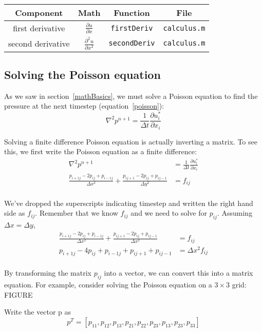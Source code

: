 \documentclass[12pt]{article}
\begin{document}
\begin{center}
\begin{tabular}{|c|c|c|c|}
\hline 
\bf{Component} & \bf{Math} & \bf{Function} & \bf{File}\\ 
\hline 
first derivative & $\frac{\partial u}{\partial x}$ & \texttt{firstDeriv} & \texttt{calculus.m}\\ 
\hline 
second derivative & $\frac{\partial^2 u}{\partial x^2}$ & \texttt{secondDeriv} & \texttt{calculus.m}\\ 
\hline 
\end{tabular} 
\end{center}

\subsection{Solving the Poisson equation}
As we saw in section~\ref{mathBasics}, we must solve a Poisson equation to find the pressure at the next timestep (equation~\ref{poisson}):
\[\nabla^2 p^{n+1} = \frac{1}{\Delta t}\frac{\partial u_i^*}{\partial x_i} \]

Solving a finite difference Poisson equation is actually inverting a matrix.  To see this, we first write the Poisson equation as a finite difference:
\begin{align*}
\nabla^2 p^{n+1} &= \frac{1}{\Delta t}\frac{\partial u_i^*}{\partial x_i} \\
\frac{p_{i+1j}-2p_{ij}+p_{i-1j}}{\Delta x^2} + \frac{p_{ij+1}-2p_{ij}+p_{ij-1}}{\Delta y^2} &= f_{ij}  \\
\end{align*}

We've dropped the superscripts indicating timestep and written the right hand side as $f_{ij}$.  Remember that we know $f_{ij}$ and we need to solve for $p_{ij}$.  Assuming $\Delta x = \Delta y$,
\begin{align*}
\frac{p_{i+1j}-2p_{ij}+p_{i-1j}}{\Delta x^2} + \frac{p_{ij+1}-2p_{ij}+p_{ij-1}}{\Delta x^2} &= f_{ij}  \\
p_{i+1j}-4p_{ij}+p_{i-1j}+ p_{ij+1}+p_{ij-1} &= \Delta x^2 f_{ij}  \\
\end{align*}

By transforming the matrix $p_{ij}$ into a vector, we can convert this into a matrix equation.  For example, consider solving the Poisson equation on a $3 \times 3$ grid:
FIGURE

Write the vector p as
\[ p^{T} = [p_{11}, p_{12}, p_{13}, p_{21}, p_{22}, p_{23}, p_{13}, p_{23}, p_{33}]\]
\end{document}
